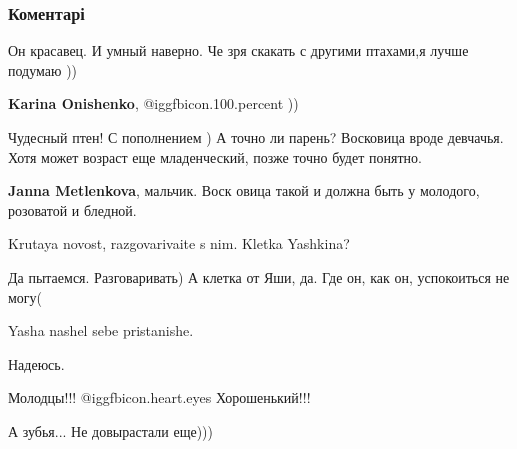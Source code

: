  
 
 
 
 
\subsubsection{Коментарі}
\label{sec:30_10_2018.fb.saf_svetlana.doneck.dnr.1.doma_u_nas_novyj_zhilec.cmt}

\begin{itemize} %
Он красавец. И умный наверно. Че зря скакать с другими птахами,я лучше подумаю ))

\textbf{Karina Onishenko},  @igg{fbicon.100.percent} ))


Чудесный птен! С пополнением ) А точно ли парень? Восковица вроде девчачья.
Хотя может возраст еще младенческий, позже точно будет понятно.

\textbf{Janna Metlenkova}, мальчик. Воск овица такой и должна быть у молодого, розоватой и бледной.

Krutaya novost, razgovarivaite s nim. Kletka Yashkina?

Да пытаемся. Разговаривать)
А клетка от Яши, да. Где он, как он, успокоиться не могу(

Yasha nashel sebe pristanishe.

Надеюсь.

Молодцы!!! @igg{fbicon.heart.eyes}  Хорошенький!!!

А зубья... Не довырастали еще)))

\end{itemize} %
